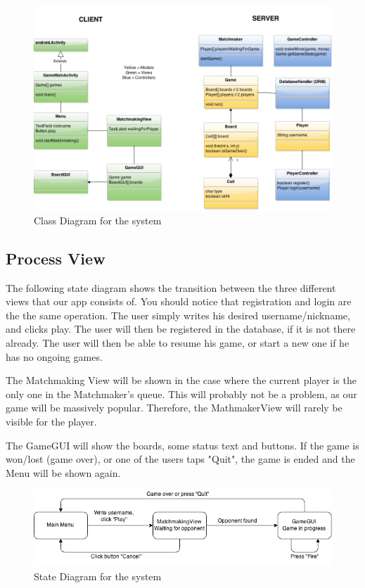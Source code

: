 \begin{figure}[H]
  \centering
    \includegraphics[width=\textwidth]{figs/class_diagram.png}
  \caption{Class Diagram for the system}
\end{figure}

\subsection{Process View}
\label{processview}

The following state diagram shows the transition between the three different views that our app consists of. You should notice that registration and login are the the same operation. The user simply writes his desired username/nickname, and clicks play. The user will then be registered in the database, if it is not there already. The user will then be able to resume his game, or start a new one if he has no ongoing games.

The Matchmaking View will be shown in the case where the current player is the only one in the Matchmaker's queue. This will probably not be a problem, as our game will be massively popular. Therefore, the MathmakerView will rarely be visible for the player.

The GameGUI will show the boards, some status text and buttons. If the game is won/lost (game over), or one of the users taps "Quit", the game is ended and the Menu will be shown again.

\begin{figure}[H]
  \centering
    \includegraphics[width=\textwidth]{figs/state_diagram.png}
  \caption{State Diagram for the system}
\end{figure}

